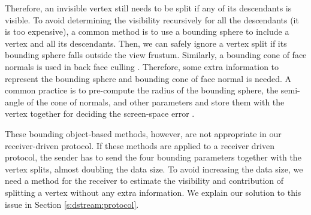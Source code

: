     Therefore, an invisible vertex still needs to be split if any of its descendants is visible. 
    To avoid determining the visibility %
    recursively for all the descendants (it is too expensive), 
    a common method is to use a bounding sphere to include a vertex and all its descendants.
    Then, we can safely ignore a vertex split if its bounding sphere
    falls outside the view frustum.
    Similarly, a bounding cone of face normals is used in back face culling \cite{258843}.
    Therefore, some extra information to represent the bounding sphere
    and bounding cone of face normal is needed. A common practice is to
    pre-compute the radius of the bounding sphere, %
    the semi-angle of the cone of normals, %
    and other parameters %
    and store them with the vertex together for deciding the screen-space error \cite{258843, kim:view}.
    
    These bounding object-based methods, however, are not appropriate
    in our receiver-driven protocol. 
    If these methods are applied to a receiver driven protocol, the sender has to send
    the four bounding parameters together with the vertex splits, almost doubling 
    the data size. 
    To avoid increasing the data size, 
    we need a method for the receiver to estimate the visibility and contribution of 
    splitting a vertex without any extra information.
    We explain our solution to this issue in Section \ref{s:dstream:protocol}.


